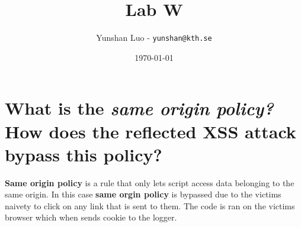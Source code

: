 \documentclass{article}   	%
\begin{document}
\title{Lab W}
\author{Yunshan Luo - \texttt{yunshan@kth.se}}
\date{\today}							%


\maketitle

\section*{What is the \textit{same origin policy?} How does the reflected XSS attack bypass this policy?}
\textbf{Same origin policy} is a rule that only lets script access data belonging to the same origin. In this case 
\textbf{same orgin policy} is bypassed due to the victims naivety to click on any link that is sent to them. 
The code is ran on the victims browser which when sends cookie to the logger.
	
\end{document}
